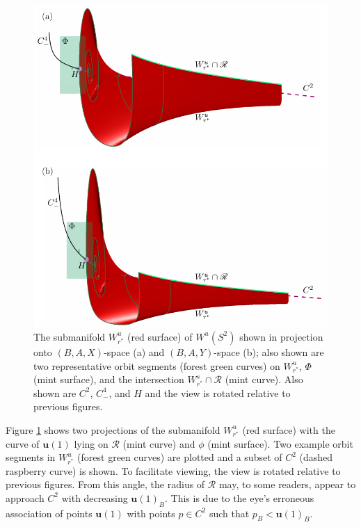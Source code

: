 \documentclass{ws-ijbc}
\begin{document}
\begin{figure}[H]
\centering
\includegraphics[]{./figures/MKMO_7.pdf}
\caption{The submanifold $W^u_{r^*}$ (red surface) of $W^u(S^2)$ shown in projection onto $(B,A,X)$-space (a) and $(B,A,Y)$-space (b); also shown are two representative orbit segments (forest green curves) on $W^u_{r^*}$, $\Phi$ (mint surface), and the intersection $W^s_{r^*}\cap\mathscr{R}$ (mint curve).  Also shown are $C^2$, $C^4_-$, and $H$ and the view is rotated relative to previous figures.}
\label{figure_7}
\end{figure}

Figure \ref{figure_7} shows two projections of the submanifold $W^u_{r^*}$ (red surface) with the curve of $\mathbf{u}(1)$ lying on $\mathscr{R}$ (mint curve) and $\phi$ (mint surface).  Two example orbit segments in $W^u_{r^*}$ (forest green curves) are plotted and a subset of $C^2$ (dashed raspberry curve) is shown.  To facilitate viewing, the view is rotated relative to previous figures.  From this angle, the radius of $\mathscr{R}$ may, to some readers, appear to approach $C^2$ with decreasing $\mathbf{u}(1)_B$.  This is due to the eye's erroneous association of points $\mathbf{u}(1)$ with points $p \in C^2$ such that $p_B < \mathbf{u}(1)_B$.
\end{document}
